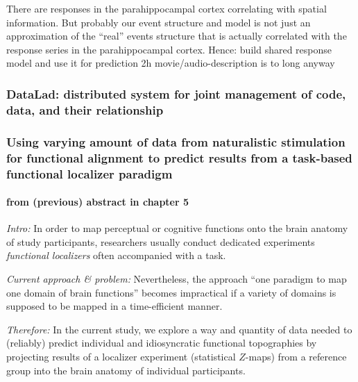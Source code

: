 %
There are responses in the parahippocampal cortex correlating with
spatial information.
%
But probably our event structure and model is not just an approximation of the
``real'' events structure that is actually correlated with the response series
in the parahippocampal cortex.
%
Hence: build shared response model and use it for prediction
%
2h movie/audio-description is to long anyway


\subsubsection{DataLad: distributed system for joint management of code, data,
and their relationship}



\subsubsection{Using varying amount of data from naturalistic stimulation for
functional alignment to predict results from a task-based functional localizer
paradigm}

\paragraph{from (previous) abstract in chapter 5}
\textit{Intro:} In order to map perceptual or cognitive functions onto the brain
anatomy of study participants, researchers usually conduct dedicated experiments
\textit{functional localizers} often accompanied with a task.

\textit{Current approach \& problem:} Nevertheless, the approach ``one paradigm
to map one domain of brain functions'' becomes impractical if a variety of
domains is supposed to be mapped in a time-efficient manner.

\textit{Therefore:} In the current study, we explore a way and quantity of data
needed to (reliably) predict individual and idiosyncratic functional
topographies by projecting results of a localizer experiment (statistical
$Z$-maps) from a reference group into the brain anatomy of individual
participants.

